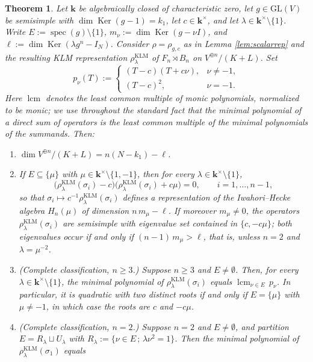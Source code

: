 \documentclass[11pt]{article}
\newtheorem{theorem}{Theorem}[section]
\theoremstyle{definition}
\theoremstyle{remark}
\newcommand{\GL}{\mathrm{GL}}
\newcommand{\Ker}{\operatorname{Ker}}
\newcommand{\spec}{\operatorname{spec}}
\newcommand{\kk}{\boldsymbol{k}}
\newcommand{\rKLM}{\rho^{\mathrm{KLM}}_{\lambda}}
\begin{document}
\pagebreak[2]
\begin{theorem}\label{thm:classification}
Let $\kk$ be algebraically closed of characteristic zero, let
$g \in \GL(V)$ be semisimple with $\dim \Ker(g - 1) = k_1$, let
$c \in \kk^{\times}$, and let $\lambda \in \kk^{\times} \setminus \{1\}$.
Write $E := \spec(g) \setminus \{1\}$, $m_\nu := \dim\Ker(g - \nu I)$,
and $\ell := \dim \Ker(\lambda g^n - I_N)$. Consider $\rho = \rho_{g,c}$
as in Lemma \ref{lem:scalarrep} and the resulting KLM representation
$\rKLM$ of $F_n \rtimes B_n$ on $V^{\oplus n}/(K + L)$. Set
\[
p_\nu(T) :=
\begin{cases}
(T - c)(T + c\nu), & \nu \neq -1,\\
(T - c)^2, & \nu = -1.
\end{cases}
\]
Here $\operatorname{lcm}$ denotes the least common multiple of monic
polynomials, normalized to be monic; we use throughout the standard fact
that the minimal polynomial of a direct sum of operators is the least
common multiple of the minimal polynomials of the summands.
Then:
\begin{enumerate}
\item[(i)] $\dim V^{\oplus n}/(K + L) = n(N - k_1) - \ell$.
\item[(ii)] If $E \subseteq \{\mu\}$ with
$\mu \in \kk^{\times} \setminus \{1, -1\}$, then for every
$\lambda \in \kk^{\times}\setminus\{1\}$,
\[
\bigl(\rKLM(\sigma_i) - c\bigr)\bigl(\rKLM(\sigma_i) + c\mu\bigr) = 0,
\qquad i = 1, \dots, n-1,
\]
so that $\sigma_i \mapsto c^{-1}\rKLM(\sigma_i)$ defines a representation
of the Iwahori--Hecke algebra $H_n(\mu)$ of dimension $n\,m_{\mu} - \ell$.
If moreover $m_{\mu} \neq 0$, the operators $\rKLM(\sigma_i)$ are
semisimple with eigenvalue set contained in $\{c, -c\mu\}$; both
eigenvalues occur if and only if $(n-1)\,m_\mu > \ell$, that is, unless
$n = 2$ and $\lambda = \mu^{-2}$.
\item[(iii)] (Complete classification, $n \geq 3$.) Suppose $n \geq 3$
and $E \neq \emptyset$. Then, for every
$\lambda \in \kk^{\times}\setminus\{1\}$, the minimal polynomial of
$\rKLM(\sigma_i)$ equals
$\operatorname{lcm}_{\nu \in E}\, p_\nu$. In particular, it is
quadratic with two distinct roots if and only if $E = \{\mu\}$ with
$\mu \neq -1$, in which case the roots are $c$ and $-c\mu$.
\item[(iv)] (Complete classification, $n = 2$.) Suppose $n = 2$ and
$E \neq \emptyset$, and partition $E = R_\lambda \sqcup U_\lambda$ with
$R_\lambda := \{\nu \in E \,;\, \lambda\nu^2 = 1\}$. Then the minimal
polynomial of $\rKLM(\sigma_1)$ equals

\end{enumerate}
\end{theorem}
\end{document}
